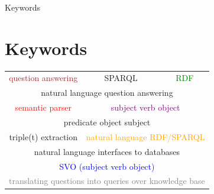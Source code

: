\documentclass[10pt]{beamer}
\begin{document}
\begin{frame}{Keywords}

\section{Keywords}

\begin{table}
\Large
\centering
\begin{tabular}{ccc}
	\textcolor{brown}{question answering} & SPARQL & \textcolor{green}{RDF} \\
	\multicolumn{3}{c}{natural language question answering} \\ 
	\textcolor{red}{semantic parser} & \multicolumn{2}{c}{\textcolor{purple}{subject verb object}} \\
	\multicolumn{3}{c}{predicate object subject} \\
	triple(t) extraction & \multicolumn{2}{c}{\textcolor{orange}{natural language RDF/SPARQL}} \\
	\multicolumn{3}{c}{natural language interfaces to databases} \\
	\multicolumn{3}{c}{\textcolor{blue}{SVO (subject verb object)}} \\
	\multicolumn{3}{c}{\textcolor{gray}{translating questions into queries over knowledge base}}
\end{tabular}
\end{table}

\end{frame}

\end{document}
